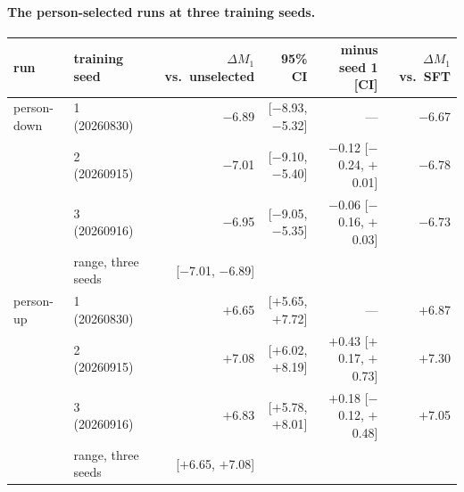 \paragraph*{The person-selected runs at three training seeds.}
\begin{center}\scriptsize\setlength{\tabcolsep}{3.5pt}
\begin{tabular}{llrrrr}\toprule
run & training seed & $\Delta M_1$ vs.\ unselected & 95\% CI & minus seed 1 [CI] & $\Delta M_1$ vs.\ SFT \\ \midrule
person-down & 1 (20260830) & $-$6.89 & [$-$8.93, $-$5.32] & --- & $-$6.67 \\
 & 2 (20260915) & $-$7.01 & [$-$9.10, $-$5.40] & $-$0.12 [$-$0.24, $+$0.01] & $-$6.78 \\
 & 3 (20260916) & $-$6.95 & [$-$9.05, $-$5.35] & $-$0.06 [$-$0.16, $+$0.03] & $-$6.73 \\
 & range, three seeds & [$-$7.01, $-$6.89] & & & \\
\midrule
person-up & 1 (20260830) & $+$6.65 & [$+$5.65, $+$7.72] & --- & $+$6.87 \\
 & 2 (20260915) & $+$7.08 & [$+$6.02, $+$8.19] & $+$0.43 [$+$0.17, $+$0.73] & $+$7.30 \\
 & 3 (20260916) & $+$6.83 & [$+$5.78, $+$8.01] & $+$0.18 [$-$0.12, $+$0.48] & $+$7.05 \\
 & range, three seeds & [$+$6.65, $+$7.08] & & & \\
\bottomrule\end{tabular}\end{center}
